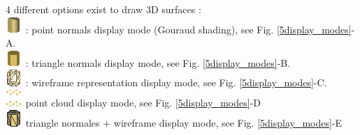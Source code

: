 4 different options exist to draw 3D surfaces :\\
\includegraphics[scale=0.7]{images/06/display/point_normals.png} : point normals display mode (Gouraud shading), see Fig. \ref{5display_modes}-A.\\
\includegraphics[scale=0.7]{images/06/display/cell_normals.png} : triangle normals display mode, see Fig. \ref{5display_modes}-B. \\
\includegraphics[scale=0.7]{images/06/display/wireframe.png} : wireframe representation  display mode, see Fig. \ref{5display_modes}-C.\\
\includegraphics[scale=0.7]{images/06/display/points.png} point cloud display mode, see Fig. \ref{5display_modes}-D\\
\includegraphics[scale=0.7]{images/06/display/cell_normals2.png} triangle normales + wireframe display mode, see Fig. \ref{5display_modes}-E\\


